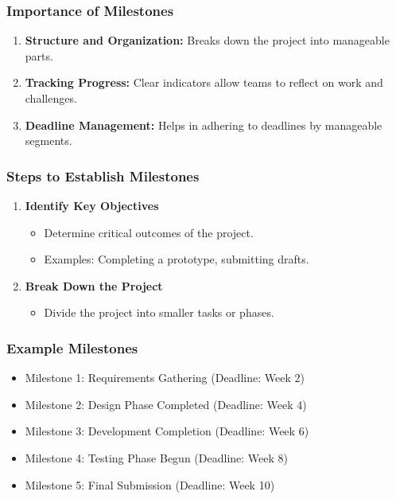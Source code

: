 \documentclass[aspectratio=169]{beamer}
\begin{document}
\begin{frame}[fragile]
    \frametitle{Importance of Milestones}
    \begin{enumerate}
        \item \textbf{Structure and Organization:} Breaks down the project into manageable parts.
        \item \textbf{Tracking Progress:} Clear indicators allow teams to reflect on work and challenges.
        \item \textbf{Deadline Management:} Helps in adhering to deadlines by manageable segments.
    \end{enumerate}
\end{frame}

\begin{frame}[fragile]
    \frametitle{Steps to Establish Milestones}
    \begin{enumerate}
        \item \textbf{Identify Key Objectives}
        \begin{itemize}
            \item Determine critical outcomes of the project.
            \item Examples: Completing a prototype, submitting drafts.
        \end{itemize}
        
        \item \textbf{Break Down the Project}
        \begin{itemize}
            \item Divide the project into smaller tasks or phases.
        \end{itemize}
    \end{enumerate}
\end{frame}

\begin{frame}[fragile]
    \frametitle{Example Milestones}
    \begin{itemize}
        \item Milestone 1: Requirements Gathering (Deadline: Week 2)
        \item Milestone 2: Design Phase Completed (Deadline: Week 4)
        \item Milestone 3: Development Completion (Deadline: Week 6)
        \item Milestone 4: Testing Phase Begun (Deadline: Week 8)
        \item Milestone 5: Final Submission (Deadline: Week 10)
    \end{itemize}
\end{frame}
\end{document}
